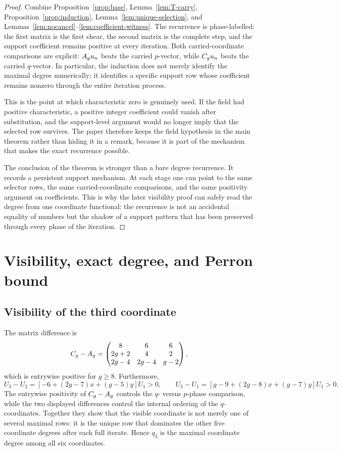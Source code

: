 \documentclass[11pt]{article}
\theoremstyle{remark}
\numberwithin{equation}{section}
\begin{document}
\begin{proof}
Combine Proposition~\ref{prop:base}, Lemma~\ref{lem:T-carry},
Proposition~\ref{prop:induction}, Lemma~\ref{lem:unique-selection}, and
Lemmas~\ref{lem:nocancel}--\ref{lem:coefficient-witness}.  The recurrence is
phase-labelled: the first matrix
is the first shear, the second matrix is the complete step, and the support
coefficient remains positive at every iteration.  Both carried-coordinate
comparisons are explicit: \(A_g u_n\) beats the carried \(p\)-vector, while
\(C_g u_n\) beats the carried \(q\)-vector.  In particular, the induction does
not merely identify the maximal degree numerically; it identifies a specific
support row whose coefficient remains nonzero through the entire iteration
process.
\par
This is the point at which characteristic zero is genuinely used.  If the field
had positive characteristic, a positive integer coefficient could vanish after
substitution, and the support-level argument would no longer imply that the
selected row survives.  The paper therefore keeps the field hypothesis in the
main theorem rather than hiding it in a remark, because it is part of the
mechanism that makes the exact recurrence possible.
\par
The conclusion of the theorem is stronger than a bare degree recurrence.  It
records a persistent support mechanism.  At each stage one can point to the
same selector rows, the same carried-coordinate comparisons, and the same
positivity argument on coefficients.  This is why the later visibility proof
can safely read the degree from one coordinate functional: the recurrence is
not an accidental equality of numbers but the shadow of a support pattern that
has been preserved through every phase of the iteration.
\end{proof}

\section{Visibility, exact degree, and Perron bound}\label{sec:visibility}

\subsection{Visibility of the third coordinate}\label{sec:visible}

The matrix difference is
\[
C_g-A_g=
\begin{pmatrix}
8&6&6\\
2g+2&4&2\\
2g-4&2g-4&g-2
\end{pmatrix},
\]
which is entrywise positive for \(g\geq 8\).  Furthermore,
\[
U_3-U_2=[-6+(2g-7)x+(g-5)y]U_1>0,
\qquad
U_3-U_1=[g-9+(2g-8)x+(g-7)y]U_1>0.
\]
The entrywise positivity of \(C_g-A_g\) controls the \(q\)- versus \(p\)-phase
comparison, while the two displayed differences control the internal ordering
of the \(q\)-coordinates.  Together they show that the visible coordinate is
not merely one of several maximal rows: it is the unique row that dominates the
other five coordinate degrees after each full iterate.  Hence \(q_3\) is the
maximal coordinate degree among all six coordinates.
\end{document}

